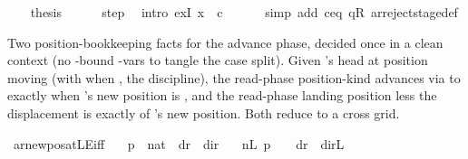 \begin{isabellebody}
\ \ \isamarkupfalse%
\ {\isacharquery}{\kern0pt}thesis\isanewline
\ \ \ \ \isamarkupfalse%
\ step\ \isamarkupfalse%
\ {\isacharparenleft}{\kern0pt}intro\ exI{\isacharbrackleft}{\kern0pt}\ x\ {\isacharequal}{\kern0pt}\ {\isacharquery}{\kern0pt}c{\isacharprime}{\kern0pt}{\isacharprime}{\kern0pt}{\isacharbrackright}{\kern0pt}{\isacharparenright}{\kern0pt}\isanewline
\ \ \ \ \ \ {\isacharparenleft}{\kern0pt}simp\ add{\isacharcolon}{\kern0pt}\ c{\isacharprime}{\kern0pt}{\isacharunderscore}{\kern0pt}eq\ qR\ ar{\isacharunderscore}{\kern0pt}reject{\isacharunderscore}{\kern0pt}stage{\isacharunderscore}{\kern0pt}def{\isacharparenright}{\kern0pt}\isanewline
{}\isamarkupfalse%
%
\endisatagproof
{\isafoldproof}%
%
\isadelimproof
%
\endisadelimproof
%
\begin{isamarkuptext}%
Two position-bookkeeping facts for the advance phase, decided
  once in a clean context (no -bound \isa{{\isacharquery}{\kern0pt}}-vars to
  tangle the case split).  Given 's head at position
   moving  (with  when
  , the  discipline), the read-phase
  position-kind  advances via  to 
  exactly when 's new position is , and the
  read-phase landing position less the  displacement is
  exactly  of 's new position.  Both reduce to
  a  cross 
  grid.%
\end{isamarkuptext}\isamarkuptrue%
\isamarkupfalse%
\ ar{\isacharunderscore}{\kern0pt}newpos{\isacharunderscore}{\kern0pt}atLE{\isacharunderscore}{\kern0pt}iff{\isacharcolon}{\kern0pt}\isanewline
\ \ \ p\ {\isacharcolon}{\kern0pt}{\isacharcolon}{\kern0pt}\ nat\ \ dr\ {\isacharcolon}{\kern0pt}{\isacharcolon}{\kern0pt}\ dir\isanewline
\ \ \ nL{}{\isacharcolon}{\kern0pt}\ {\isachardoublequoteopen}p\ {\isacharequal}{\kern0pt}\ {}\ {\isasymLongrightarrow}\ dr\ {\isasymnoteq}\ dir{\isachardot}{\kern0pt}L{\isachardoublequoteclose}\isanewline

\end{isabellebody}
